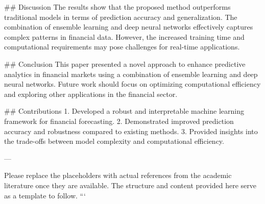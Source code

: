 ## Discussion
The results show that the proposed method outperforms traditional models in terms of prediction accuracy and generalization. The combination of ensemble learning and deep neural networks effectively captures complex patterns in financial data. However, the increased training time and computational requirements may pose challenges for real-time applications.

## Conclusion
This paper presented a novel approach to enhance predictive analytics in financial markets using a combination of ensemble learning and deep neural networks. Future work should focus on optimizing computational efficiency and exploring other applications in the financial sector.

## Contributions
1. Developed a robust and interpretable machine learning framework for financial forecasting.
2. Demonstrated improved prediction accuracy and robustness compared to existing methods.
3. Provided insights into the trade-offs between model complexity and computational efficiency.

---

Please replace the placeholders with actual references from the academic literature once they are available. The structure and content provided here serve as a template to follow.
```